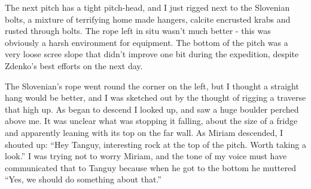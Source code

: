 The next pitch has a tight pitch-head, and I just rigged next to the Slovenian bolts, a mixture of terrifying home made hangers, calcite encrusted krabs and rusted through bolts. The rope left in situ wasn’t much better - this was obviously a harsh environment for equipment. The bottom of the pitch was a very loose scree slope that didn’t improve one bit during the expedition, despite Zdenko’s best efforts on the next day.

The Slovenian’s rope went round the corner on the left, but I thought a straight hang would be better, and I was sketched out by the thought of rigging a traverse that high up. As began to descend I looked up, and saw a huge boulder perched above me. It was unclear what was stopping it falling, about the size of a fridge and apparently leaning with its top on the far wall. As Miriam descended, I shouted up: “Hey Tanguy, interesting rock at the top of the pitch. Worth taking a look.” I was trying not to worry Miriam, and the tone of my voice must have communicated that to Tanguy because when he got to the bottom he muttered “Yes, we should do something about that.”

